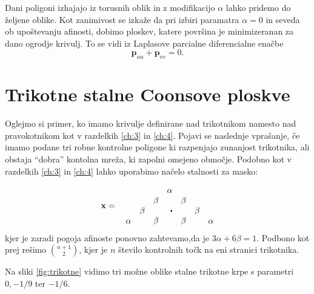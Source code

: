 \documentclass[a4paper,12pt]{article}
\begin{document}
Dani poligoni izhajajo iz torusnih oblik in z modifikacijo $\alpha$ lahko pridemo do željene oblike.
Kot zanimivost se izkaže da pri izbiri paramatra $\alpha = 0$ in seveda ob upoštevanju afinosti,
dobimo ploskev, katere površina je minimizeranan za dano ogrodje krivulj. To se vidi iz Laplasove parcialne 
diferencialne enačbe
$$\mathbf{p}_{uu} + \mathbf{p}_{vv} = 0.$$


\section{Trikotne stalne Coonsove ploskve}

Oglejmo si primer, ko imamo krivulje definirane nad trikotnikom 
namesto nad pravokotnikom kot v razdelkih \ref{ch:3} in \ref{ch:4}.
Pojavi se naslednje vprašanje, če imamo podane tri robne kontrolne poligone 
ki razpenjajo zunanjost trikotnika, ali obstaja  ``dobra''
kontolna mreža, ki zapolni omejeno območje. 
Podobno kot v razdelkih \ref{ch:3} in \ref{ch:4} lahko uporabimo načelo 
stalnosti za masko:

$$
\mathbf{x} =  \quad 
\begin{matrix*}[r]
          &       &       & \alpha   &       &       & \\
          &       & \beta &          & \beta &       & \\
          & \beta &       & \sbullet &       & \beta & \\
   \alpha &       & \beta &          & \beta &       & \alpha
\end{matrix*}
$$
kjer je zaradi pogoja afinoste ponovno zahtevamo,da je $3\alpha + 6\beta = 1$.
Podbono kot prej rešimo $\binom{n+1}{2}$, kjer je $n$ število kontrolnih točk 
na eni stranici trikotnika.

Na sliki \ref{fig:trikotne} vidimo tri možne oblike stalne trikotne
krpe s parametri $0,-1/9$ ter $-1/6$.

\end{document}

